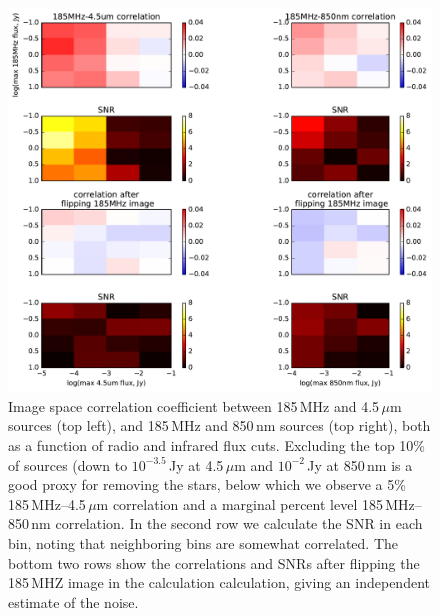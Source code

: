 \documentclass{emulateapj}
\begin{document}
\begin{figure}[h]
\centering
\includegraphics[width=5.5in]{images/source_correlation_grids_and_snrs.pdf}
\caption{Image space correlation coefficient between 185\,MHz and 4.5\,$\mu$m sources (top left), and 185\,MHz and 850\,nm sources (top right), both as a function of radio and infrared flux cuts. Excluding the top 10\% of sources (down to $10^{-3.5}$\,Jy at 4.5\,$\mu$m and $10^{-2}$\,Jy at 850\,nm is a good proxy for removing the stars, below which we observe a 5\% 185\,MHz--4.5\,$\mu$m correlation and a marginal percent level 185\,MHz--850\,nm correlation. In the second row we calculate the SNR in each bin, noting that neighboring bins are somewhat correlated. The bottom two rows show the correlations and SNRs after flipping the 185\,MHZ image in the calculation calculation, giving an independent estimate of the noise.}
\label{fig:correlationsandSNRs}
\end{figure}
\end{document}
